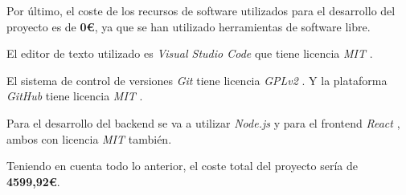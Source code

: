 \vspace{1cm}

Por último, el coste de los recursos de software utilizados para el desarrollo
del proyecto es de \textbf{0€}, ya que se han utilizado herramientas de software libre.

El editor de texto utilizado es \textit{Visual Studio Code} \cite{vscode} que tiene
licencia \textit{MIT} \cite{mit-license}.

El sistema de control de versiones \textit{Git} \cite{git} tiene licencia
\textit{GPLv2} \cite{gplv2}. Y la plataforma \textit{GitHub} \cite{github} tiene
licencia \textit{MIT} \cite{mit-license}.

Para el desarrollo del backend se va a utilizar \textit{Node.js} \cite{nodejs}
y para el frontend \textit{React} \cite{react}, ambos con licencia
\textit{MIT} \cite{mit-license} también.

\vspace{1cm}

Teniendo en cuenta todo lo anterior, el coste total del proyecto sería de
\textbf{4599,92€}.
